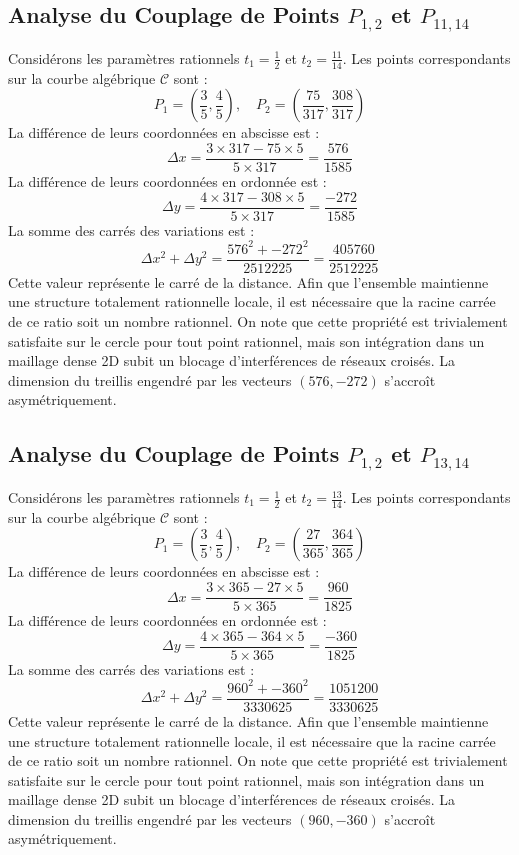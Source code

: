 \documentclass[12pt, a4paper]{article}
\begin{document}
\subsection{Analyse du Couplage de Points $P_{1,2}$ et $P_{11,14}$}
Considérons les paramètres rationnels $t_1 = \frac{1}{2}$ et $t_2 = \frac{11}{14}$.
Les points correspondants sur la courbe algébrique $\mathcal{C}$ sont :
$$ P_1 = \left( \frac{3}{5}, \frac{4}{5} \right), \quad P_2 = \left( \frac{75}{317}, \frac{308}{317} \right) $$
La différence de leurs coordonnées en abscisse est :
$$ \Delta x = \frac{3 \times 317 - 75 \times 5}{5 \times 317} = \frac{576}{1585} $$
La différence de leurs coordonnées en ordonnée est :
$$ \Delta y = \frac{4 \times 317 - 308 \times 5}{5 \times 317} = \frac{-272}{1585} $$
La somme des carrés des variations est :
$$ \Delta x^2 + \Delta y^2 = \frac{ 576^2 + -272^2 }{ 2512225 } = \frac{ 405760 }{ 2512225 } $$
Cette valeur représente le carré de la distance. Afin que l'ensemble maintienne une structure totalement rationnelle locale, il est nécessaire que la racine carrée de ce ratio soit un nombre rationnel. On note que cette propriété est trivialement satisfaite sur le cercle pour tout point rationnel, mais son intégration dans un maillage dense 2D subit un blocage d'interférences de réseaux croisés. La dimension du treillis engendré par les vecteurs $( 576, -272 )$ s'accroît asymétriquement.


\subsection{Analyse du Couplage de Points $P_{1,2}$ et $P_{13,14}$}
Considérons les paramètres rationnels $t_1 = \frac{1}{2}$ et $t_2 = \frac{13}{14}$.
Les points correspondants sur la courbe algébrique $\mathcal{C}$ sont :
$$ P_1 = \left( \frac{3}{5}, \frac{4}{5} \right), \quad P_2 = \left( \frac{27}{365}, \frac{364}{365} \right) $$
La différence de leurs coordonnées en abscisse est :
$$ \Delta x = \frac{3 \times 365 - 27 \times 5}{5 \times 365} = \frac{960}{1825} $$
La différence de leurs coordonnées en ordonnée est :
$$ \Delta y = \frac{4 \times 365 - 364 \times 5}{5 \times 365} = \frac{-360}{1825} $$
La somme des carrés des variations est :
$$ \Delta x^2 + \Delta y^2 = \frac{ 960^2 + -360^2 }{ 3330625 } = \frac{ 1051200 }{ 3330625 } $$
Cette valeur représente le carré de la distance. Afin que l'ensemble maintienne une structure totalement rationnelle locale, il est nécessaire que la racine carrée de ce ratio soit un nombre rationnel. On note que cette propriété est trivialement satisfaite sur le cercle pour tout point rationnel, mais son intégration dans un maillage dense 2D subit un blocage d'interférences de réseaux croisés. La dimension du treillis engendré par les vecteurs $( 960, -360 )$ s'accroît asymétriquement.
\end{document}
